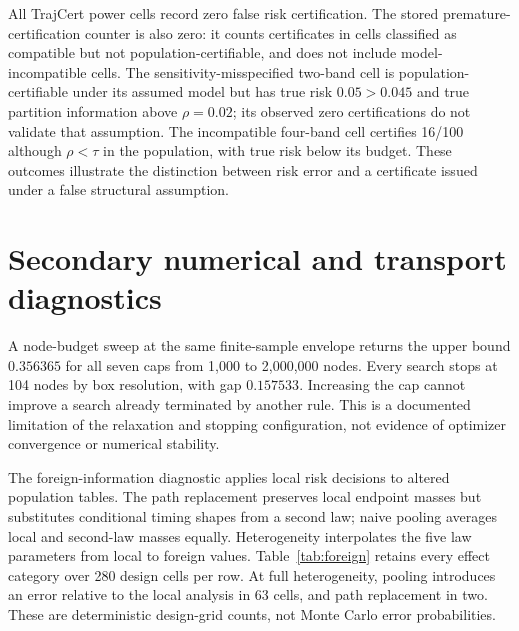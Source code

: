 \documentclass[10pt]{article}
\begin{document}
All TrajCert power cells record zero false risk certification. The stored premature-certification counter is also zero: it counts certificates in cells classified as compatible but not population-certifiable, and does not include model-incompatible cells. The sensitivity-misspecified two-band cell is population-certifiable under its assumed model but has true risk $0.05>0.045$ and true partition information above $\rho=0.02$; its observed zero certifications do not validate that assumption. The incompatible four-band cell certifies 16/100 although $\rho<\tau$ in the population, with true risk below its budget. These outcomes illustrate the distinction between risk error and a certificate issued under a false structural assumption.

\section{Secondary numerical and transport diagnostics}
A node-budget sweep at the same finite-sample envelope returns the upper bound $0.356365$ for all seven caps from 1,000 to 2,000,000 nodes. Every search stops at 104 nodes by box resolution, with gap $0.157533$. Increasing the cap cannot improve a search already terminated by another rule. This is a documented limitation of the relaxation and stopping configuration, not evidence of optimizer convergence or numerical stability.

The foreign-information diagnostic applies local risk decisions to altered population tables. The path replacement preserves local endpoint masses but substitutes conditional timing shapes from a second law; naive pooling averages local and second-law masses equally. Heterogeneity interpolates the five law parameters from local to foreign values. Table~\ref{tab:foreign} retains every effect category over 280 design cells per row. At full heterogeneity, pooling introduces an error relative to the local analysis in 63 cells, and path replacement in two. These are deterministic design-grid counts, not Monte Carlo error probabilities.

\begin{table}[!htbp]\centering\small
\caption{Foreign-information effects relative to the local analysis. Each row sums to 280. NC: no change; BT: tightening without a newly introduced error; CW: widening; EB: newly introduced erroneous bound; MI: model incompatible. Labels classify relative effects, not validity under the local true law.}\label{tab:foreign}

\end{table}
\end{document}
